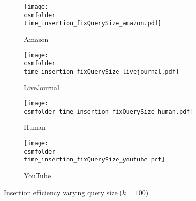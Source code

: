 \begin{figure}[h!]
\def\wscorevone{0.35}
\centering
    \begin{subfigure}[t]{\wscorevone\linewidth}
	    \centering
	    \resizebox{\linewidth}{!}
	    {
	        \texttt{[image: \\csmfolder time\_insertion\_fixQuerySize\_amazon.pdf]}
	    }
	    \caption{Amazon}
	    \label{fig:time:insertion:fixQuerySize:amazon}
    \end{subfigure}
    \begin{subfigure}[t]{\wscorevone\linewidth}
        \centering
        \resizebox{\linewidth}{!}
        {
            \texttt{[image: \\csmfolder  time\_insertion\_fixQuerySize\_livejournal.pdf]}
        }
        \caption{LiveJournal}
        \label{fig:time:insertion:fixQuerySize:livejournal}
    \end{subfigure}
     \begin{subfigure}[t]{\wscorevone\linewidth}
         \centering
         \resizebox{\linewidth}{!}
         {
             \texttt{[image: \\csmfolder  time\_insertion\_fixQuerySize\_human.pdf]}
         }
         \caption{Human}
         \label{fig:time:insertion:fixQuerySize:human}
     \end{subfigure}
     \begin{subfigure}[t]{\wscorevone\linewidth}
         \centering
         \resizebox{\linewidth}{!}
         {
             \texttt{[image: \\csmfolder  time\_insertion\_fixQuerySize\_youtube.pdf]}
         }
         \caption{YouTube}
         \label{fig:time:insertion:fixQuerySize:youtube}
     \end{subfigure}
\caption{Insertion efficiency varying query size ($k=100$)}
\label{fig:time:insertion:fixQuerySize}
\end{figure}